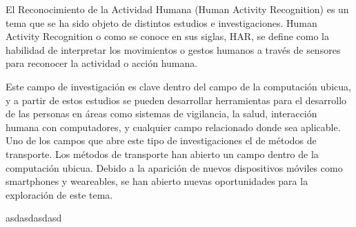 
El Reconocimiento de la Actividad Humana\cite{Humanactivityrecognition} (Human Activity Recognition) es un tema que se ha sido objeto de distintos estudios e investigaciones. 
Human Activity Recognition o como se conoce en sus siglas, HAR, se define como la habilidad de interpretar los movimientos o gestos humanos a través de sensores para reconocer la actividad o acción humana.\cite{10.1007/s11390-011-9430-9}

Este campo de investigación es clave dentro del campo de la computación ubicua\cite{10.5555/2832747.2832806}, y a partir de estos estudios se pueden desarrollar herramientas para el desarrollo de las personas en áreas como sistemas de vigilancia\cite{10.1007/s11390-011-9430-9}, la salud\cite{10.1145/3195106.3195157}, interacción humana con computadores\cite{10.1007/s11390-011-9430-9}, y cualquier campo relacionado donde sea aplicable. \newline
Uno de los campos que abre este tipo de investigaciones el de métodos de transporte\cite{Efthymiou2019}. Los métodos de transporte han abierto un campo dentro de la computación ubicua. Debido a la aparición de nuevos dispositivos móviles como smartphones y weareables, se han abierto nuevas oportunidades para la exploración de este tema.


asdasdasdasd











